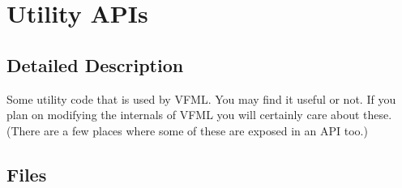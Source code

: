 \section{Utility APIs}
\label{group__UtilAPI}


\subsection{Detailed Description}
Some utility code that is used by VFML. You may find it useful or not. If you plan on modifying the internals of VFML you will certainly care about these. (There are a few places where some of these are exposed in an API too.) 

\subsection*{Files}
